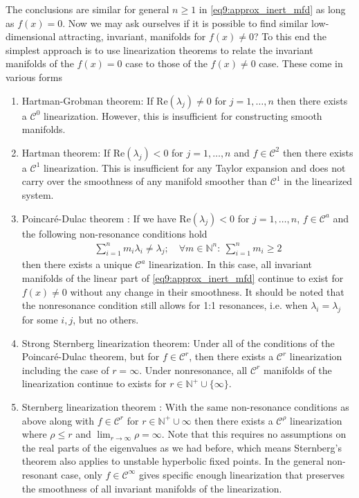 The conclusions are similar for general $n\geq 1$ in \eqref{eq9:approx_inert_mfd} as long as $f(x) = 0$. Now we may ask ourselves if it is possible to find similar low-dimensional attracting, invariant, manifolds for $f(x) \neq 0$? To this end the simplest approach is to use linearization theorems to relate the invariant manifolds of the $f(x)=0$ case to those of the $f(x) \neq 0$ case. These come in various forms
\begin{enumerate}
	\item Hartman-Grobman theorem: If $ \textrm{Re} (\lambda_j) \neq 0$ for $j=1,\ldots,n$ then there exists a $\mathcal{C}^{0}$ linearization. However, this is insufficient for constructing smooth manifolds.
	\item Hartman theorem: If $ \textrm{Re} (\lambda_j)<0$ for $j=1,\ldots,n$ and $f\in \mathcal{C}^{2}$ then there exists a $\mathcal{C}^{1}$ linearization. This is insufficient for any Taylor expansion and does not carry over the smoothness of any manifold smoother than $\mathcal{C}^{1}$ in the linearized system.
	\item Poincaré-Dulac theorem \cite{poincare1951}: If we have $ \textrm{Re} (\lambda_j)<0$ for $j=1,\ldots,n$, $f\in \mathcal{C}^{a}$ and the following non-resonance conditions hold
		\begin{align}
			\sum_{i=1}^{n} m_i \lambda_i \neq \lambda_j;\quad \forall m\in\mathbb{N}^{n}:\ \sum_{i=1}^{n} m_{i} \geq 2
		\end{align}
		then there exists a unique $\mathcal{C}^{a}$ linearization. In this case, all invariant manifolds of the linear part of \eqref{eq9:approx_inert_mfd} continue to exist for $f(x)\neq 0$ without any change in their smoothness. It should be noted that the nonresonance condition still allows for 1:1 resonances, i.e. when $\lambda_i = \lambda_j$ for some $i,j$, but no others.
	\item Strong Sternberg linearization theorem: Under all of the conditions of the Poincaré-Dulac theorem, but for $f\in \mathcal{C}^{r}$, then there exists a $\mathcal{C}^{r}$ linearization including the case of $r=\infty $. Under nonresonance, all $\mathcal{C}^{r}$ manifolds of the linearization continue to exists for $r \in \mathbb{N}^{+}\cup \{\infty \}$.
	\item Sternberg linearization theorem \cite{Sternberg1957}: With the same non-resonance conditions as above along with $f\in\mathcal{C}^{r}$ for $r \in \mathbb{N}^{+}\cup \infty $ then there exists a $\mathcal{C}^{\rho}$ linearization where $\rho\leq r$ and $\lim_{r\to \infty }\rho = \infty $. Note that this requires no assumptions on the real parts of the eigenvalues as we had before, which means Sternberg's theorem also applies to unstable hyperbolic fixed points. In the general non-resonant case, only $f\in \mathcal{C}^{\infty }$ gives specific enough linearization that preserves the smoothness of all invariant manifolds of the linearization.  
		
\end{enumerate}
